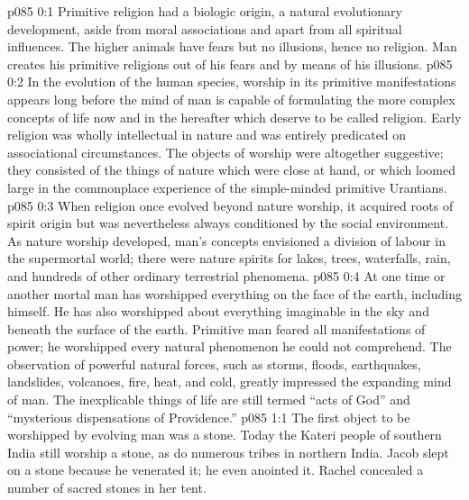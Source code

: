 \author{Brilliant Evening Star}
\vs p085 0:1 Primitive religion had a biologic origin, a natural evolutionary development, aside from moral associations and apart from all spiritual influences. The higher animals have fears but no illusions, hence no religion. Man creates his primitive religions out of his fears and by means of his illusions.
\vs p085 0:2 In the evolution of the human species, worship in its primitive manifestations appears long before the mind of man is capable of formulating the more complex concepts of life now and in the hereafter which deserve to be called religion. Early religion was wholly intellectual in nature and was entirely predicated on associational circumstances. The objects of worship were altogether suggestive; they consisted of the things of nature which were close at hand, or which loomed large in the commonplace experience of the simple\hyp{}minded primitive Urantians.
\vs p085 0:3 When religion once evolved beyond nature worship, it acquired roots of spirit origin but was nevertheless always conditioned by the social environment. As nature worship developed, man’s concepts envisioned a division of labour in the supermortal world; there were nature spirits for lakes, trees, waterfalls, rain, and hundreds of other ordinary terrestrial phenomena.
\vs p085 0:4 At one time or another mortal man has worshipped everything on the face of the earth, including himself. He has also worshipped about everything imaginable in the sky and beneath the surface of the earth. Primitive man feared all manifestations of power; he worshipped every natural phenomenon he could not comprehend. The observation of powerful natural forces, such as storms, floods, earthquakes, landslides, volcanoes, fire, heat, and cold, greatly impressed the expanding mind of man. The inexplicable things of life are still termed “acts of God” and “mysterious dispensations of Providence.”
\vs p085 1:1 The first object to be worshipped by evolving man was a stone. Today the Kateri people of southern India still worship a stone, as do numerous tribes in northern India. Jacob slept on a stone because he venerated it; he even anointed it. Rachel concealed a number of sacred stones in her tent.
